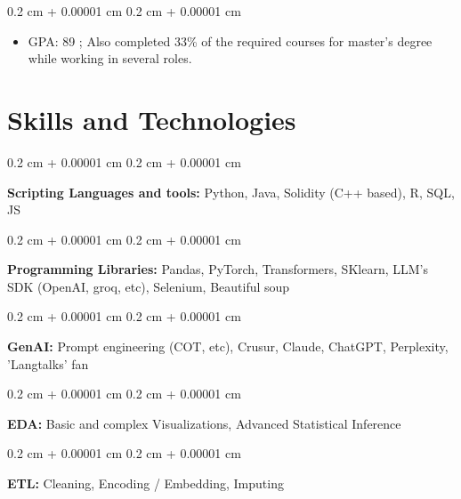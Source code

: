 \documentclass[10pt, letterpaper]{article}
\newenvironment{highlights}{
    \begin{itemize}[
        topsep=0.10 cm,
        parsep=0.10 cm,
        partopsep=0pt,
        itemsep=0pt,
        leftmargin=0.4 cm + 10pt
    ]
}{
    \end{itemize}
} %
\newenvironment{onecolentry}{
    \begin{adjustwidth}{
        0.2 cm + 0.00001 cm
    }{
        0.2 cm + 0.00001 cm
    }
}{
    \end{adjustwidth}
} %
\begin{document}
        \vspace{0.10 cm}
        \begin{onecolentry}
            \begin{highlights}
                \item GPA: 89 ; Also completed 33\% of the required courses for master's degree while working in several roles.
            \end{highlights}
        \end{onecolentry}



    
    \section{Skills and Technologies}



        
        \begin{onecolentry}
            \textbf{Scripting Languages and tools:} Python, Java, Solidity (C++ based), R, SQL, JS
        \end{onecolentry}

        \vspace{0.2 cm}

        \begin{onecolentry}
            \textbf{Programming Libraries:} Pandas, PyTorch, Transformers, SKlearn, LLM's SDK (OpenAI, groq, etc), Selenium, Beautiful soup
        \end{onecolentry}

        \vspace{0.2 cm}

        \begin{onecolentry}
            \textbf{GenAI:} Prompt engineering (COT, etc), Crusur, Claude, ChatGPT, Perplexity, 'Langtalks' fan
        \end{onecolentry}

        \vspace{0.2 cm}

        \begin{onecolentry}
            \textbf{EDA:} Basic and complex Visualizations, Advanced Statistical Inference
        \end{onecolentry}

        \vspace{0.2 cm}

        \begin{onecolentry}
            \textbf{ETL:} Cleaning, Encoding / Embedding, Imputing
        \end{onecolentry}
\end{document}

